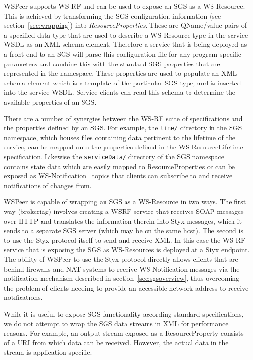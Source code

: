 \documentclass[a4paper]{article}
\begin{document}
WSPeer supports WS-RF and can be used to expose an SGS as a WS-Resource. This is achieved by transforming the SGS configuration information (see section~\ref{sec:wrapping}) into \textit{ResourceProperties\/}. These are QName/value pairs of a specified data type that are used to describe a WS-Resource type in the service WSDL as an XML schema element. Therefore a service that is being deployed as a front-end to an SGS will parse this configuration file for any program specific parameters and combine this with the standard SGS properties that are represented in the namespace. These properties are used to populate an XML schema element which is a template of the particular SGS type, and is inserted into the service WSDL. Service clients can read this schema to determine the available properties of an SGS.

There are a number of synergies between the WS-RF suite of specifications and the properties defined by an SGS. For example, the \texttt{time/} directory in the SGS namespace, which houses files containing data pertinent to the lifetime of the service, can be mapped onto the properties defined in the WS-ResourceLifetime~\cite{wsrf-lifetime} specification. Likewise the \texttt{serviceData/} directory of the SGS namespace contains state data which are easily mapped to ResourceProperties or can be exposed as WS-Notification~\cite{wsrf-notification} topics that clients can subscribe to and receive notifications of changes from.

WSPeer is capable of wrapping an SGS as a WS-Resource in two ways.  The first way (brokering) involves creating a WSRF service that receives SOAP messages over HTTP and translates the information therein into Styx messages, which it sends to a separate SGS server (which may be on the same host). The second is to use the Styx protocol itself to send and receive XML. In this case the WS-RF service that is exposing the SGS as WS-Resources is deployed at a Styx endpoint. The ability of WSPeer to use the Styx protocol directly allows clients that are behind firewalls and NAT systems to receive WS-Notification messages via the notification mechanism described in section~\ref{sec:sgsoverview}, thus overcoming the problem of clients needing to provide an accessible network address to receive notifications.

While it is useful to expose SGS functionality according standard specifications, we do not attempt to wrap the SGS data streams in XML for performance reasons. For example, an output stream exposed as a ResourceProperty consists of a URI from which data can be received. However, the actual data in the stream is application specific.
\end{document}

